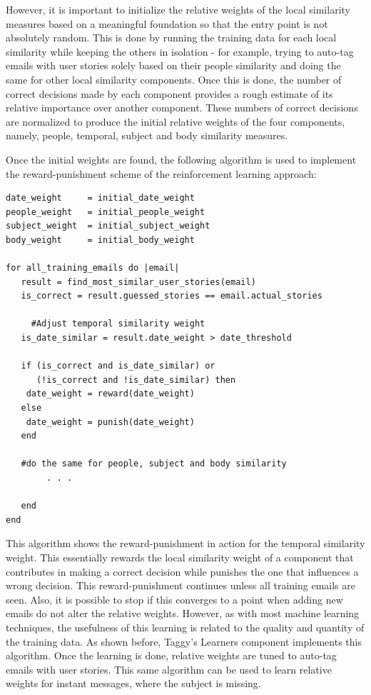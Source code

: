 However, it is important to initialize the relative weights of the local similarity measures based on a meaningful foundation so that the entry point is not absolutely random. This is done by running the training data for each local similarity while keeping the others in isolation - for example, trying to auto-tag emails with user stories solely based on their people similarity and doing the same for other local similarity components. Once this is done, the number of correct decisions made by each component provides a rough estimate of its relative importance over another component. These numbers of correct decisions are normalized to produce the initial relative weights of the four components, namely, people, temporal, subject and body similarity measures.

Once the initial weights are found, the following algorithm is used to implement the reward-punishment scheme of the reinforcement learning approach:

\pagebreak
\begin{verbatim}
date_weight     = initial_date_weight
people_weight   = initial_people_weight
subject_weight  = initial_subject_weight
body_weight     = initial_body_weight

for all_training_emails do |email|
   result = find_most_similar_user_stories(email)
   is_correct = result.guessed_stories == email.actual_stories

	 #Adjust temporal similarity weight
   is_date_similar = result.date_weight > date_threshold

   if (is_correct and is_date_similar) or 
      (!is_correct and !is_date_similar) then
    date_weight = reward(date_weight)
   else
    date_weight = punish(date_weight)
   end

   #do the same for people, subject and body similarity
		. . .
		
   end
end
\end{verbatim}
This algorithm shows the reward-punishment in action for the temporal similarity weight. This essentially rewards the local similarity weight of a component that contributes in making a correct decision while punishes the one that influences a wrong decision. This reward-punishment continues unless all training emails are seen. Also, it is possible to stop if this converges to a point when adding new emails do not alter the relative weights. However, as with most machine learning techniques, the usefulness of this learning is related to the quality and quantity of the training data. As shown before, Taggy's Learners component implements this algorithm. Once the learning is done, relative weights are tuned to auto-tag emails with user stories. This same algorithm can be used to learn relative weights for instant messages, where the subject is missing.

